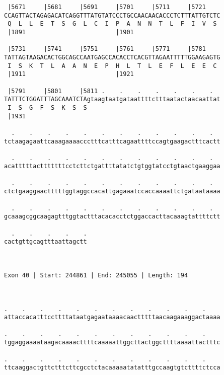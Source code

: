 \documentclass{article}
\begin{document}
\begin{Verbatim}
 |5671     |5681     |5691     |5701     |5711     |5721    
CCAGTTACTAGAGACATCAGGTTTATGTATCCCTGCCAACAACACCCTCTTTATTGTCTC
 Q  L  L  E  T  S  G  L  C  I  P  A  N  N  T  L  F  I  V  S 
 |1891                         |1901                        
  
 |5731     |5741     |5751     |5761     |5771     |5781    
TATTAGTAAGACACTGGCAGCCAATGAGCCACACCTCACGTTAGAATTTTTGGAAGAGTG
 I  S  K  T  L  A  A  N  E  P  H  L  T  L  E  F  L  E  E  C 
 |1911                         |1921                        
  
 |5791     |5801     |5811 .    .    .    .    .    .    .  
TATTTCTGGATTTAGCAAATCTAgtaagtaatgataattttctttaatactaacaattat
 I  S  G  F  S  K  S  S                                     
 |1931                                                      
  
  .    .    .    .    .    .    .    .    .    .    .    .  
tctaagagaattcaaagaaaaccctttcatttcagaattttccagtgaagactttcactt
                                                            
  .    .    .    .    .    .    .    .    .    .    .    .  
acatttttactttttttcctcttctgattttatatctgtggtatcctgtaactgaaggaa
                                                            
  .    .    .    .    .    .    .    .    .    .    .    .  
ctctgaaggaactttttggtaggccacattgagaaatccaccaaaattctgataataaaa
                                                            
  .    .    .    .    .    .    .    .    .    .    .    .  
gcaaagcggcaagagtttggtactttacacacctctggaccacttacaaagtattttctt
                                                            
  .    .    .    .    .
cactgttgcagtttaattagctt
                       
                       
 
Exon 40 | Start: 244861 | End: 245055 | Length: 194



.    .    .    .    .    .    .    .    .    .    .    .    
attaccacatttccttttataatgagaataaaacaactttttaacaagaaaggactaaaa
                                                            
.    .    .    .    .    .    .    .    .    .    .    .    
tggaggaaaataagacaaaacttttcaaaaattggcttactggcttttaaaattactttc
                                                            
.    .    .    .    .    .    .    .    .    .    .    .    
ttcaaggactgttctttcttcgcctctacaaaaatatatttgccaagtgtcttttctcca
                                                            

\end{Verbatim}
\end{document}
